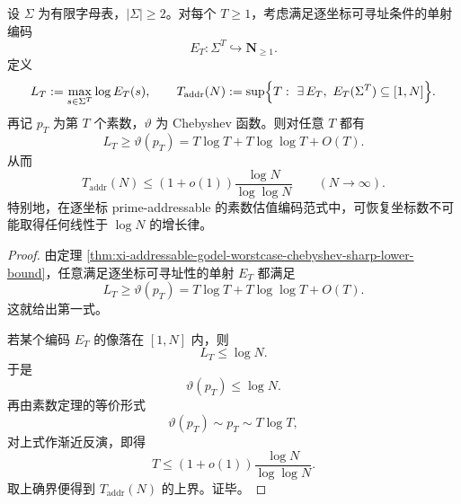 \begin{theorem}[可寻址素数外置编码的反向通信律]\label{thm:conclusion-addressable-prime-ledger-reverse-communication-law}
设 \(\Sigma\) 为有限字母表，\(|\Sigma|\ge 2\)。对每个 \(T\ge 1\)，考虑满足逐坐标可寻址条件的单射编码
\[
E_T:\Sigma^T\hookrightarrow \mathbf N_{\ge 1}.
\]
定义
\[
L_T:=\max_{s\in\Sigma^T}\log E_T(s),
\qquad
T_{\mathrm{addr}}(N):=
\sup\Bigl\{T:\ \exists\,E_T,\ E_T(\Sigma^T)\subseteq [1,N]\Bigr\}.
\]
再记 \(p_T\) 为第 \(T\) 个素数，\(\vartheta\) 为 Chebyshev 函数。则对任意 \(T\) 都有
\[
L_T\ge \vartheta(p_T)
=
T\log T+T\log\log T+O(T).
\]
从而
\[
T_{\mathrm{addr}}(N)\le (1+o(1))\frac{\log N}{\log\log N}
\qquad (N\to\infty).
\]
特别地，在逐坐标 prime-addressable 的素数估值编码范式中，可恢复坐标数不可能取得任何线性于 \(\log N\) 的增长律。
\end{theorem}
\begin{proof}
由定理 \ref{thm:xi-addressable-godel-worstcase-chebyshev-sharp-lower-bound}，任意满足逐坐标可寻址性的单射 \(E_T\) 都满足
\[
L_T\ge \vartheta(p_T)
=
T\log T+T\log\log T+O(T).
\]
这就给出第一式。

若某个编码 \(E_T\) 的像落在 \([1,N]\) 内，则
\[
L_T\le \log N.
\]
于是
\[
\vartheta(p_T)\le \log N.
\]
再由素数定理的等价形式
\[
\vartheta(p_T)\sim p_T\sim T\log T,
\]
对上式作渐近反演，即得
\[
T\le (1+o(1))\frac{\log N}{\log\log N}.
\]
取上确界便得到 \(T_{\mathrm{addr}}(N)\) 的上界。证毕。
\end{proof}

